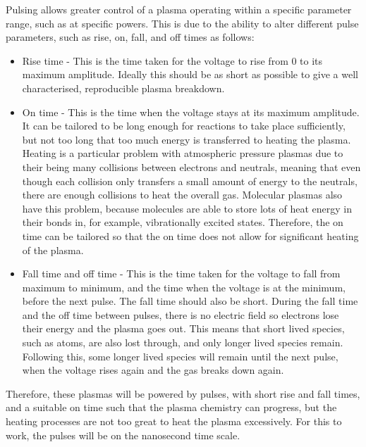 \documentclass[11pt, oneside]{article}   	%
\newcommand{\todo}[1]{ \textcolor{red}{\bf{To Do:} #1}}
\begin{document}
Pulsing allows greater control of a plasma operating within a specific parameter range, such as at specific powers.
This is due to the ability to alter different pulse parameters, such as rise, on, fall, and off times as follows:
\begin{itemize}
\item Rise time - This is the time taken for the voltage to rise from 0 to its maximum amplitude. 
Ideally this should be as short as possible to give a well characterised, reproducible plasma breakdown.
\item On time - This is the time when the voltage stays at its maximum amplitude. 
It can be tailored to be long enough for reactions to take place sufficiently, but not too long that too much energy is transferred to heating the plasma. 
Heating is a particular problem with atmospheric pressure plasmas due to their being many collisions between electrons and neutrals, meaning that even though each collision only transfers a small amount of energy to the neutrals, there are enough collisions to heat the overall gas. 
Molecular plasmas also have this problem, because molecules are able to store lots of heat energy in their bonds in, for example, vibrationally excited states.
Therefore, the on time can be tailored so that the on time does not allow for significant heating of the plasma.
\item Fall time and off time - This is the time taken for the voltage to fall from maximum to minimum, and the time when the voltage is at the minimum, before the next pulse. The fall time should also be short. 
During the fall time and the off time between pulses, there is no electric field so electrons lose their energy and the plasma goes out. 
This means that short lived species, such as atoms, are also lost through, and only longer lived species remain. 
Following this, some longer lived species will remain until the next pulse, when the voltage rises again and the gas breaks down again.
\end{itemize}

Therefore, these plasmas will be powered by pulses, with short rise and fall times, and a suitable on time such that the plasma chemistry can progress, but the heating processes are not too great to heat the plasma excessively.
For this to work, the pulses will be on the nanosecond time scale.

\end{document}
